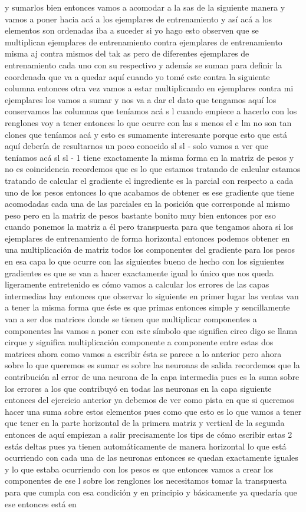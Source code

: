 y sumarlos bien entonces vamos a acomodar a la sas de la siguiente manera y vamos a poner hacia acá a los ejemplares de entrenamiento y así acá a los elementos son ordenadas iba a suceder si yo hago esto observen que se multiplican ejemplares de entrenamiento contra ejemplares de entrenamiento misma aj contra mismos del tak as pero de diferentes ejemplares de entrenamiento cada uno con su respectivo y además se suman para definir la coordenada que va a quedar aquí cuando yo tomé este contra la siguiente columna entonces otra vez vamos a estar multiplicando en ejemplares contra mi ejemplares los vamos a sumar y nos va a dar el dato que tengamos aquí los conservamos las columnas que teníamos acá s l cuando empiece a hacerlo con los renglones voy a tener entonces lo que ocurre con las s menos el c lm no son tan clones que teníamos acá y esto es sumamente interesante porque esto que está aquí debería de resultarnos un poco conocido sl sl - solo vamos a ver que teníamos acá sl sl - 1 tiene exactamente la misma forma en la matriz de pesos y no es coincidencia recordemos que es lo que estamos tratando de calcular estamos tratando de calcular el gradiente el ingrediente es la parcial con respecto a cada uno de los pesos entonces lo que acabamos de obtener es ese gradiente que tiene acomodadas cada una de las parciales en la posición que corresponde al mismo peso pero en la matriz de pesos bastante bonito muy bien entonces por eso cuando ponemos la matriz a él pero transpuesta para que tengamos ahora si los ejemplares de entrenamiento de forma horizontal entonces podemos obtener en una multiplicación de matriz todos los componentes del gradiente para los pesos en esa capa lo que ocurre con las siguientes bueno de hecho con los siguientes gradientes es que se van a hacer exactamente igual lo único que nos queda ligeramente entretenido es cómo vamos a calcular los errores de las capas intermedias hay entonces que observar lo siguiente en primer lugar las ventas van a tener la misma forma que éste es que primas entonces simple y sencillamente van a ser dos matrices donde se tienen que multiplicar componentes a componentes las vamos a poner con este símbolo que significa circo digo se llama cirque y significa multiplicación componente a componente entre estas dos matrices ahora como vamos a escribir ésta se parece a lo anterior pero ahora sobre lo que queremos es sumar es sobre las neuronas de salida recordemos que la contribución al error de una neurona de la capa intermedia pues es la suma sobre los errores a los que contribuyó en todas las neuronas en la capa siguiente entonces del ejercicio anterior ya debemos de ver como pista en que si queremos hacer una suma sobre estos elementos pues como que esto es lo que vamos a tener que tener en la parte horizontal de la primera matriz y vertical de la segunda entonces de aquí empiezan a salir precisamente los tips de cómo escribir estas 2 estás deltas pues ya tienen automáticamente de manera horizontal lo que está ocurriendo con cada una de las neuronas entonces se quedan exactamente iguales y lo que estaba ocurriendo con los pesos es que entonces vamos a crear los componentes de ese l sobre los renglones los necesitamos tomar la transpuesta para que cumpla con esa condición y en principio y básicamente ya quedaría que ese entonces está en 